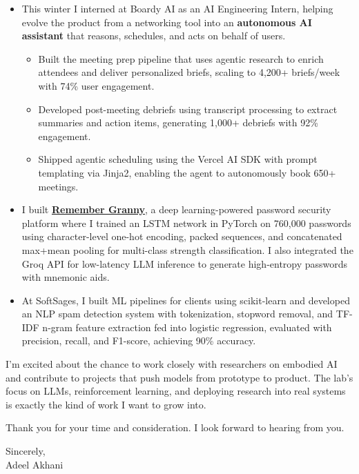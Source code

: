\documentclass[letterpaper,11pt]{article}
\begin{document}
\begin{itemize}[leftmargin=15pt]

    \item This winter I interned at Boardy AI as an AI Engineering Intern, helping evolve the product from a networking tool into an \textbf{autonomous AI assistant} that reasons, schedules, and acts on behalf of users.
    \begin{itemize}
        \item Built the meeting prep pipeline that uses agentic research to enrich attendees and deliver personalized briefs, scaling to 4,200+ briefs/week with 74\% user engagement.
        \item Developed post-meeting debriefs using transcript processing to extract summaries and action items, generating 1,000+ debriefs with 92\% engagement.
        \item Shipped agentic scheduling using the Vercel AI SDK with prompt templating via Jinja2, enabling the agent to autonomously book 650+ meetings.
    \end{itemize}

    \item I built \textbf{\underline{\href{https://github.com/adeelakhani/RememberGranny}{Remember Granny}}}, a deep learning-powered password security platform where I trained an LSTM network in PyTorch on 760,000 passwords using character-level one-hot encoding, packed sequences, and concatenated max+mean pooling for multi-class strength classification. I also integrated the Groq API for low-latency LLM inference to generate high-entropy passwords with mnemonic aids.

    \item At SoftSages, I built ML pipelines for clients using scikit-learn and developed an NLP spam detection system with tokenization, stopword removal, and TF-IDF n-gram feature extraction fed into logistic regression, evaluated with precision, recall, and F1-score, achieving 90\% accuracy.

\end{itemize}

\vspace{6pt}
I’m excited about the chance to work closely with researchers on embodied AI and contribute to projects that push models from prototype to product. The lab’s focus on LLMs, reinforcement learning, and deploying research into real systems is exactly the kind of work I want to grow into.

\vspace{10pt}

Thank you for your time and consideration. I look forward to hearing from you.

\vspace{10pt}

\noindent Sincerely, \\
Adeel Akhani
\end{document}
